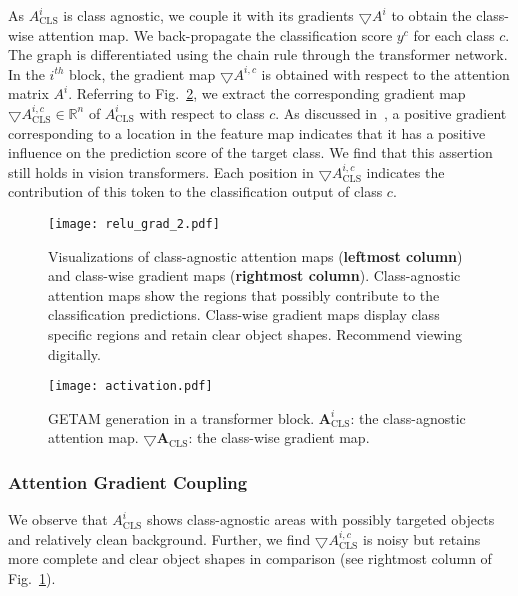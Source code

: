 \documentclass[10pt,twocolumn,letterpaper]{article}
\begin{document}
As $A_{\text{CLS}}^{i}$ is class agnostic, we couple it with its gradients
$\bigtriangledown A^{i}$ to obtain the class-wise attention map.
We back-propagate the classification
score $y^c$ for each class $c$.
The graph is differentiated using the chain rule through the transformer network.
In the $i^{th}$ block, 
the gradient map $\bigtriangledown A^{i,c}$ is obtained with respect to the attention matrix $A^i$.
Referring to Fig.~\ref{fig:getam}, we extract the corresponding gradient map
$\bigtriangledown A_{\text{CLS}}^{i,c}\in \mathbb{R}^{n} $ of $A_{\text{CLS}}^i$ with respect to class $c$.
As discussed in~\cite{selvaraju2017grad,chattopadhay2018grad,jiang2021layercam}, a positive gradient corresponding
to a location in the feature map indicates that it has a positive influence on
the prediction score of the target class.
We find that this assertion still holds in vision transformers.
Each position in $\bigtriangledown A_{\text{CLS}}^{i,c}$ indicates the contribution of this token to the classification output of class $c$.
\begin{figure}[!t]
\begin{center}
  {\texttt{[image: relu\_grad\_2.pdf]}}
  \end{center}
\caption{Visualizations of class-agnostic attention maps (\textbf{leftmost column}) and class-wise gradient maps (\textbf{rightmost column}). Class-agnostic attention maps show the regions that possibly contribute to the classification predictions. Class-wise gradient maps display class specific regions and retain clear object shapes. Recommend viewing digitally. 
}
\label{fig:relu grad}
\end{figure}

\begin{figure}[!t]
\begin{center}
  {\texttt{[image: activation.pdf]}}
  \end{center}
\caption{GETAM generation in a transformer block.
$\boldsymbol{A}_{\text{CLS}}^i$: the class-agnostic attention map. $\boldsymbol{\bigtriangledown} \boldsymbol{A}_{\text{CLS}}$: the class-wise gradient map.}
\label{fig:getam}
\end{figure}

\subsubsection{Attention Gradient Coupling}
We observe that
$A_{\text{CLS}}^i$ shows class-agnostic areas with possibly targeted objects and relatively clean background. 
Further, we find $\bigtriangledown A_{\text{CLS}}^{i,c}$ is noisy but retains more complete and clear object shapes in comparison (see rightmost column of Fig.~\ref{fig:relu grad}). 
\end{document}
